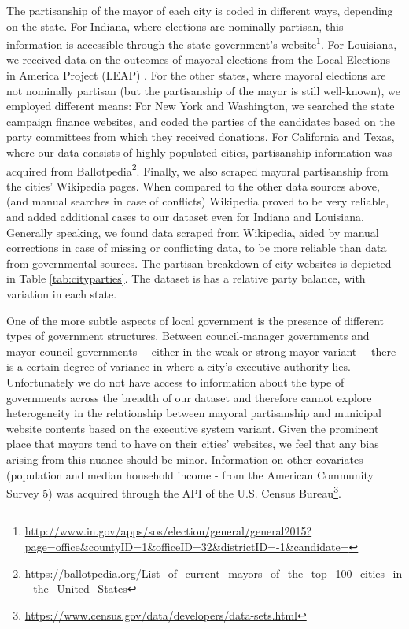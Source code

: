 \documentclass[11pt]{article}
\begin{document}
The partisanship of the mayor of each city is coded in different ways, depending on the state. For Indiana, where elections are nominally partisan, this information is accessible through the state government's website\footnote{\url{http://www.in.gov/apps/sos/election/general/general2015?page=office&countyID=1&officeID=32&districtID=-1&candidate=}}. For Louisiana, we received data on the outcomes of mayoral elections from the Local Elections in America Project (LEAP) \citep{marschall2013local}. For the other states, where mayoral elections are not nominally partisan (but the partisanship of the mayor is still well-known), we employed different means: For New York and Washington, we searched the state campaign finance websites, and coded the parties of the candidates based on the party committees from which they received donations. For California and Texas, where our data consists of highly populated cities, partisanship information was acquired from Ballotpedia\footnote{\url{https://ballotpedia.org/List_of_current_mayors_of_the_top_100_cities_in_the_United_States}}. Finally, we also scraped mayoral partisanship from the cities' Wikipedia pages. When compared to the other data sources above, (and manual searches in case of conflicts) Wikipedia proved to be very reliable, and added additional cases to our dataset even for Indiana and Louisiana. Generally speaking, we found data scraped from Wikipedia, aided by manual corrections in case of missing or conflicting data, to be more reliable than data from governmental sources. The partisan breakdown of city websites is depicted in Table \ref{tab:cityparties}. The dataset is has a relative party balance, with variation in each state.

 



One of the more subtle aspects of local government is the presence of different types of government structures. Between council-manager governments and mayor-council governments \citep{morgan1992policy}---either in the weak or strong mayor variant \citep{desantis2002city}---there is a certain degree of variance in where a city's executive authority lies. Unfortunately we do not have access to information about the type of governments across the breadth of our dataset and therefore cannot explore heterogeneity in the relationship between mayoral partisanship and municipal website contents based on the executive system variant. Given the prominent place that mayors tend to have on their cities' websites, we feel that any bias arising from this nuance should be minor. Information on other covariates (population and median household income - from the American Community Survey 5) was acquired through the API of the U.S. Census Bureau\footnote{\url{https://www.census.gov/data/developers/data-sets.html}}.
\end{document}
